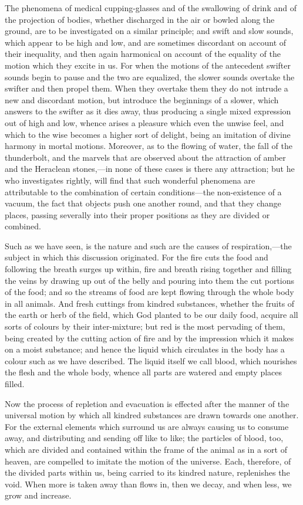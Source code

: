 The phenomena of medical cupping-glasses and of the swallowing of drink
and of the projection of bodies, whether discharged in the air or bowled
along the ground, are to be investigated on a similar principle; and swift
and slow sounds, which appear to be high and low, and are sometimes
discordant on account of their inequality, and then again harmonical on
account of the equality of the motion which they excite in us. For when
the motions of the antecedent swifter sounds begin to pause and the two
are equalized, the slower sounds overtake the swifter and then propel
them. When they overtake them they do not intrude a new and discordant
motion, but introduce the beginnings of a slower, which answers to the
swifter as it dies away, thus producing a single mixed expression out of
high and low, whence arises a pleasure which even the unwise feel, and
which to the wise becomes a higher sort of delight, being an imitation of
divine harmony in mortal motions. Moreover, as to the flowing of water,
the fall of the thunderbolt, and the marvels that are observed about the
attraction of amber and the Heraclean stones,—in none of these cases
is there any attraction; but he who investigates rightly, will find that
such wonderful phenomena are attributable to the combination of certain
conditions—the non-existence of a vacuum, the fact that objects push
one another round, and that they change places, passing severally into
their proper positions as they are divided or combined.

Such as we have seen, is the nature and such are the causes of
respiration,—the subject in which this discussion originated. For
the fire cuts the food and following the breath surges up within, fire and
breath rising together and filling the veins by drawing up out of the
belly and pouring into them the cut portions of the food; and so the
streams of food are kept flowing through the whole body in all animals.
And fresh cuttings from kindred substances, whether the fruits of the
earth or herb of the field, which God planted to be our daily food,
acquire all sorts of colours by their inter-mixture; but red is the most
pervading of them, being created by the cutting action of fire and by the
impression which it makes on a moist substance; and hence the liquid which
circulates in the body has a colour such as we have described. The liquid
itself we call blood, which nourishes the flesh and the whole body, whence
all parts are watered and empty places filled.

Now the process of repletion and evacuation is effected after the manner
of the universal motion by which all kindred substances are drawn towards
one another. For the external elements which surround us are always
causing us to consume away, and distributing and sending off like to like;
the particles of blood, too, which are divided and contained within the
frame of the animal as in a sort of heaven, are compelled to imitate the
motion of the universe. Each, therefore, of the divided parts within us,
being carried to its kindred nature, replenishes the void. When more is
taken away than flows in, then we decay, and when less, we grow and
increase.

